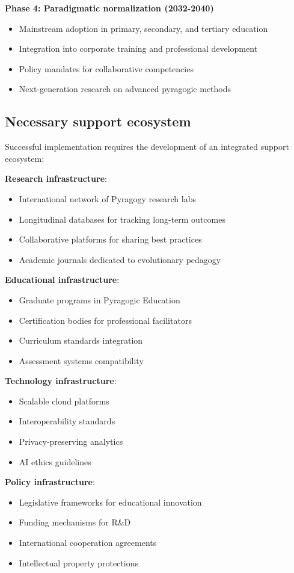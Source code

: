 \textbf{Phase 4: Paradigmatic normalization (2032-2040)}
\begin{itemize}
	\item Mainstream adoption in primary, secondary, and tertiary education
	\item Integration into corporate training and professional development
	\item Policy mandates for collaborative competencies
	\item Next-generation research on advanced pyragogic methods
\end{itemize}

\subsection{Necessary support ecosystem}

Successful implementation requires the development of an integrated support ecosystem:

\textbf{Research infrastructure}:
\begin{itemize}
	\item International network of Pyragogy research labs
	\item Longitudinal databases for tracking long-term outcomes
	\item Collaborative platforms for sharing best practices
	\item Academic journals dedicated to evolutionary pedagogy
\end{itemize}

\textbf{Educational infrastructure}:
\begin{itemize}
	\item Graduate programs in Pyragogic Education
	\item Certification bodies for professional facilitators
	\item Curriculum standards integration
	\item Assessment systems compatibility
\end{itemize}

\textbf{Technology infrastructure}:
\begin{itemize}
	\item Scalable cloud platforms
	\item Interoperability standards
	\item Privacy-preserving analytics
	\item AI ethics guidelines
\end{itemize}

\textbf{Policy infrastructure}:
\begin{itemize}
	\item Legislative frameworks for educational innovation
	\item Funding mechanisms for R\&D
	\item International cooperation agreements
	\item Intellectual property protections
\end{itemize}

